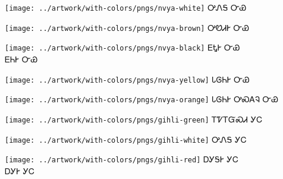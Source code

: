 \documentclass[avery5371]{flashcards}%
\begin{document}

    \begin{flashcard}{
        \texttt{[image: ../artwork/with-colors/pngs/nvya-white]}
    }
        \Huge ᎤᏁᎦ ᏅᏯ
    \end{flashcard}

    \begin{flashcard}{
        \texttt{[image: ../artwork/with-colors/pngs/nvya-brown]}
    }
        \Huge ᎤᏬᏗᎨ ᏅᏯ
    \end{flashcard}

    \begin{flashcard}{
        \texttt{[image: ../artwork/with-colors/pngs/nvya-black]}
    }
        \Huge ᎬᎿᎨ ᏅᏯ\\ᎬᏂᎨ ᏅᏯ
    \end{flashcard}

    \begin{flashcard}{
        \texttt{[image: ../artwork/with-colors/pngs/nvya-yellow]}
    }
        \Huge ᏓᎶᏂᎨ ᏅᏯ
    \end{flashcard}

    \begin{flashcard}{
        \texttt{[image: ../artwork/with-colors/pngs/nvya-orange]}
    }
        \Huge ᏓᎶᏂᎨ ᎤᏍᎪᎸ ᏅᏯ
    \end{flashcard}


    \begin{flashcard}{
        \texttt{[image: ../artwork/with-colors/pngs/gihli-green]}
    }
        \Huge ᎢᏤᎢᏳᏍᏗ ᎩᏟ
    \end{flashcard}

    \begin{flashcard}{
        \texttt{[image: ../artwork/with-colors/pngs/gihli-white]}
    }
        \Huge ᎤᏁᎦ ᎩᏟ
    \end{flashcard}

    \begin{flashcard}{
        \texttt{[image: ../artwork/with-colors/pngs/gihli-red]}
    }
        \Huge ᎠᎩᎦᎨ ᎩᏟ\\ᎠᎩᎨ ᎩᏟ
    \end{flashcard}
\end{document}
